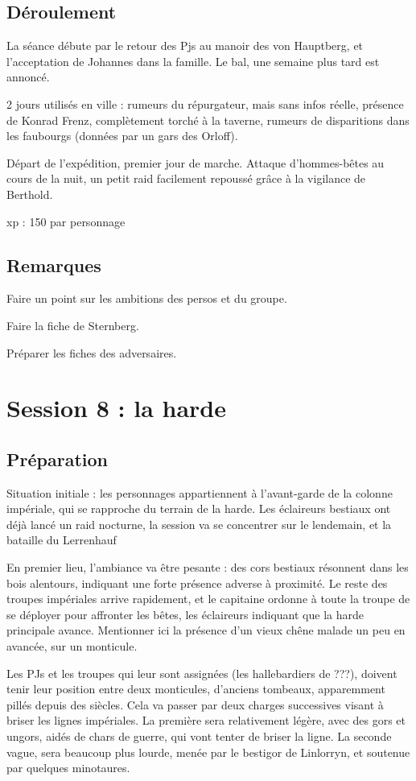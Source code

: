 \documentclass[10pt,a4paper]{book}
\begin{document}
\subsection{Déroulement}
La séance débute par le retour des Pjs au manoir des von Hauptberg, et l'acceptation de Johannes dans la famille. Le bal, une semaine plus tard est annoncé.

2 jours utilisés en ville : rumeurs du répurgateur, mais sans infos réelle, présence de Konrad Frenz, complètement torché à la taverne, rumeurs de disparitions dans les faubourgs (données par un gars des Orloff).

Départ de l'expédition, premier jour de marche. Attaque d'hommes-bêtes au cours de la nuit, un petit raid facilement repoussé grâce à la vigilance de Berthold.

xp : 150 par personnage
\subsection{Remarques}
Faire un point sur les ambitions des persos et du groupe.

Faire la fiche de Sternberg.

Préparer les fiches des adversaires.

\section{Session 8 : la harde }
\subsection{Préparation}
Situation initiale : les personnages appartiennent à l'avant-garde de la colonne impériale, qui se rapproche du terrain de la harde. Les éclaireurs bestiaux ont déjà lancé un raid nocturne, la session va se concentrer sur le lendemain, et la bataille du Lerrenhauf

En premier lieu, l'ambiance va être pesante : des cors bestiaux résonnent dans les bois alentours, indiquant une forte présence adverse à proximité. Le reste des troupes impériales arrive rapidement, et le capitaine ordonne à toute la troupe de se déployer pour affronter les bêtes, les éclaireurs indiquant que la harde principale avance. Mentionner ici la présence d'un vieux chêne malade un peu en avancée, sur un monticule.

Les PJs et les troupes qui leur sont assignées (les hallebardiers de ???), doivent tenir leur position entre deux monticules, d'anciens tombeaux, apparemment pillés depuis des siècles. Cela va passer par deux charges successives visant à briser les lignes impériales. La première sera relativement légère, avec des gors et ungors, aidés de chars de guerre, qui vont tenter de briser la ligne. La seconde vague, sera beaucoup plus lourde, menée par le bestigor de Linlorryn, et soutenue par quelques minotaures. 
\end{document}
